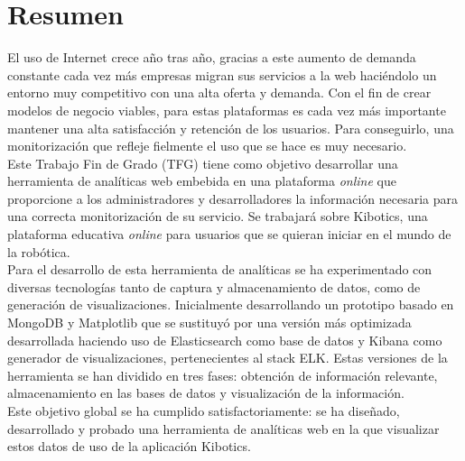 \documentclass[a4paper, 12pt]{book}
\begin{document}
		
	\chapter*{Resumen}

		El uso de Internet crece año tras año, gracias a este aumento de demanda constante cada vez más empresas migran sus servicios a la web haciéndolo un entorno muy competitivo con una alta oferta y demanda. Con el fin de crear modelos de negocio viables, para estas plataformas es cada vez más importante mantener una alta satisfacción y retención de los usuarios. Para conseguirlo, una monitorización que refleje fielmente el uso que se hace es muy necesario. \\
		
		Este Trabajo Fin de Grado (TFG) tiene como objetivo desarrollar una herramienta de analíticas web embebida en una plataforma \textit{online} que proporcione a los administradores y desarrolladores la información necesaria para una correcta monitorización de su servicio. Se trabajará sobre Kibotics, una plataforma educativa \textit{online} para usuarios que se quieran iniciar en el mundo de la robótica. \\
		
		Para el desarrollo de esta herramienta de analíticas se ha experimentado con diversas tecnologías tanto de captura y almacenamiento de datos, como de generación de visualizaciones. Inicialmente desarrollando un prototipo basado en MongoDB y Matplotlib que se sustituyó por una versión más optimizada desarrollada haciendo uso de Elasticsearch como base de datos y Kibana como generador de visualizaciones, pertenecientes al stack ELK. Estas versiones de la herramienta se han dividido en tres fases: obtención de información relevante, almacenamiento en las bases de datos y visualización de la información. \\
		
		Este objetivo global se ha cumplido satisfactoriamente: se ha diseñado, desarrollado y probado una herramienta de analíticas web en la que visualizar estos datos de uso de la aplicación Kibotics.
		
\end{document}

